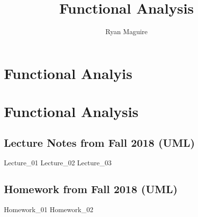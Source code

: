 \documentclass[crop=false,class=book,oneside]{standalone}
\begin{document}
    \ifx\ifmathcourses\undefined
        \newif\ifsub
        \title{Functional Analysis}
        \author{Ryan Maguire}
        \date{\vspace{-5ex}}
        \maketitle
        \tableofcontents
        \clearpage
        \chapter*{Functional Analyis}
        \setcounter{chapter}{1}
    \else
        \chapter{Functional Analysis}
    \fi
    \section{Lecture Notes from Fall 2018 (UML)}
        {Lecture_01}
        {Lecture_02}
        {Lecture_03}
    \newpage
    \section{Homework from Fall 2018 (UML)}
        {Homework_01}
        {Homework_02}
\end{document}
